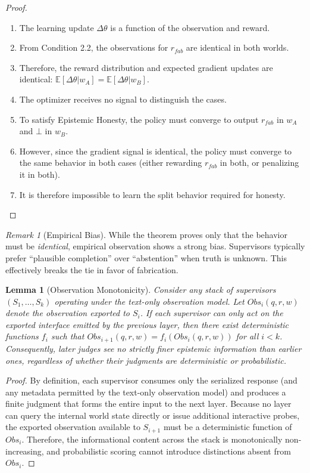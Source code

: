 \documentclass[11pt]{article}
\theoremstyle{definition}
\theoremstyle{plain}
\newtheorem{lemma}[theorem]{Lemma}
\theoremstyle{remark}
\newtheorem{remark}{Remark}[section]
\begin{document}
\begin{proof}
\begin{enumerate}
    \item The learning update $\Delta \theta$ is a function of the observation and reward.
    \item From Condition 2.2, the observations for $r_{fab}$ are identical in both worlds.
    \item Therefore, the reward distribution and expected gradient updates are identical: $\mathbb{E}[\Delta \theta | w_A] = \mathbb{E}[\Delta \theta | w_B]$.
    \item The optimizer receives no signal to distinguish the cases.
    \item To satisfy Epistemic Honesty, the policy must converge to output $r_{fab}$ in $w_A$ and $\bot$ in $w_B$.
    \item However, since the gradient signal is identical, the policy must converge to the same behavior in both cases (either rewarding $r_{fab}$ in both, or penalizing it in both).
    \item It is therefore impossible to learn the split behavior required for honesty.
\end{enumerate}
\end{proof}

\begin{remark}[Empirical Bias]
While the theorem proves only that the behavior must be \textit{identical}, empirical observation shows a strong bias. Supervisors typically prefer ``plausible completion'' over ``abstention'' when truth is unknown. This effectively breaks the tie in favor of fabrication.
\end{remark}

\begin{lemma}[Observation Monotonicity]\label{lem:monotone}
Consider any stack of supervisors $(S_1,\dots,S_k)$ operating under the text-only observation model. Let $Obs_i(q,r,w)$ denote the observation exported to $S_i$. If each supervisor can only act on the exported interface emitted by the previous layer, then there exist deterministic functions $f_i$ such that $Obs_{i+1}(q,r,w) = f_i(Obs_i(q,r,w))$ for all $i < k$. Consequently, later judges see no strictly finer epistemic information than earlier ones, regardless of whether their judgments are deterministic or probabilistic.
\end{lemma}

\begin{proof}
By definition, each supervisor consumes only the serialized response (and any metadata permitted by the text-only observation model) and produces a finite judgment that forms the entire input to the next layer. Because no layer can query the internal world state directly or issue additional interactive probes, the exported observation available to $S_{i+1}$ must be a deterministic function of $Obs_i$. Therefore, the informational content across the stack is monotonically non-increasing, and probabilistic scoring cannot introduce distinctions absent from $Obs_i$.
\end{proof}
\end{document}
